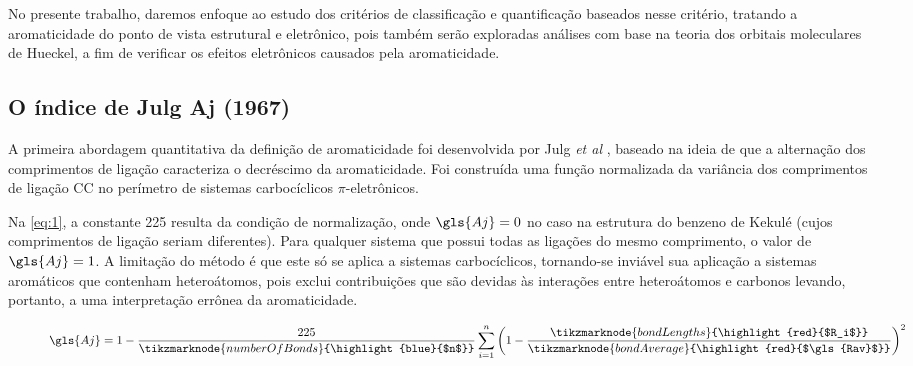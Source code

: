 No presente trabalho, daremos enfoque ao estudo dos critérios de classificação e quantificação baseados nesse critério, tratando a aromaticidade do ponto de vista estrutural e eletrônico, pois também serão exploradas análises com base na teoria dos orbitais moleculares de Hueckel, a fim de verificar os efeitos eletrônicos causados pela aromaticidade.

\subsection{O índice de Julg Aj (1967)}

A primeira abordagem quantitativa da definição de aromaticidade foi desenvolvida por Julg \textit{et al} \autocite{Julg1967, Bergmann1971}, baseado na ideia de que a alternação dos comprimentos de ligação caracteriza o decréscimo da aromaticidade. Foi construída uma função normalizada da variância dos comprimentos de ligação CC no perímetro de sistemas carbocíclicos $\pi$-eletrônicos.

Na \autoref{eq:1}, a constante 225 resulta da condição de normalização, onde $\gls{Aj} = 0$ no caso na estrutura do benzeno de Kekulé (cujos comprimentos de ligação seriam diferentes). Para qualquer sistema que possui todas as ligações do mesmo comprimento, o valor de $\gls{Aj} = 1$. A limitação do método é que este só se aplica a sistemas carbocíclicos, tornando-se inviável sua aplicação a sistemas aromáticos que contenham heteroátomos, pois exclui contribuições que são devidas às interações entre heteroátomos e carbonos levando, portanto, a uma interpretação errônea da aromaticidade.

\begin{figure}[htb]
    \vspace{2\baselineskip}
\begin{equation}
    \label{eq:1}
    \gls{Aj} = 1 - \frac{225}{\tikzmarknode{numberOfBonds}{\highlight{blue}{$n$}}} \sum^n_{i=1} \bigg{(}1 - \frac{\tikzmarknode{bondLengths}{\highlight{red}{$R_i$}}}{\tikzmarknode{bondAverage}{\highlight{red}{$\gls{Rav}$}}} \bigg{)}^2
\end{equation}
    \vspace{3.8\baselineskip}
\end{figure}


